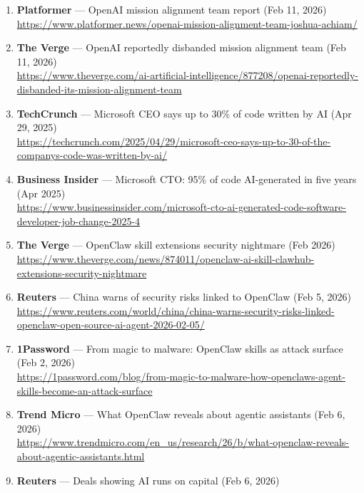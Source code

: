 \documentclass[
]{article}
\begin{document}
\begin{enumerate}
  2024)\\
  \url{https://www.reuters.com/technology/artificial-intelligence/openai-co-founder-sutskevers-new-safety-focused-ai-startup-ssi-raises-1-billion-2024-09-04/}
\item
  \textbf{Platformer} --- OpenAI mission alignment team report (Feb 11,
  2026)\\
  \url{https://www.platformer.news/openai-mission-alignment-team-joshua-achiam/}
\item
  \textbf{The Verge} --- OpenAI reportedly disbanded mission alignment
  team (Feb 11, 2026)\\
  \url{https://www.theverge.com/ai-artificial-intelligence/877208/openai-reportedly-disbanded-its-mission-alignment-team}
\item
  \textbf{TechCrunch} --- Microsoft CEO says up to 30\% of code written
  by AI (Apr 29, 2025)\\
  \url{https://techcrunch.com/2025/04/29/microsoft-ceo-says-up-to-30-of-the-companys-code-was-written-by-ai/}
\item
  \textbf{Business Insider} --- Microsoft CTO: 95\% of code AI-generated
  in five years (Apr 2025)\\
  \url{https://www.businessinsider.com/microsoft-cto-ai-generated-code-software-developer-job-change-2025-4}
\item
  \textbf{The Verge} --- OpenClaw skill extensions security nightmare
  (Feb 2026)\\
  \url{https://www.theverge.com/news/874011/openclaw-ai-skill-clawhub-extensions-security-nightmare}
\item
  \textbf{Reuters} --- China warns of security risks linked to OpenClaw
  (Feb 5, 2026)\\
  \url{https://www.reuters.com/world/china/china-warns-security-risks-linked-openclaw-open-source-ai-agent-2026-02-05/}
\item
  \textbf{1Password} --- From magic to malware: OpenClaw skills as
  attack surface (Feb 2, 2026)\\
  \url{https://1password.com/blog/from-magic-to-malware-how-openclaws-agent-skills-become-an-attack-surface}
\item
  \textbf{Trend Micro} --- What OpenClaw reveals about agentic
  assistants (Feb 6, 2026)\\
  \url{https://www.trendmicro.com/en_us/research/26/b/what-openclaw-reveals-about-agentic-assistants.html}
\item
  \textbf{Reuters} --- Deals showing AI runs on capital (Feb 6, 2026)\\

\end{enumerate}
\end{document}
